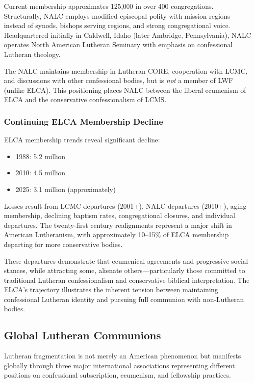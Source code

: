Current membership approximates 125,000 in over 400 congregations. Structurally, NALC employs modified episcopal polity with mission regions instead of synods, bishops serving regions, and strong congregational voice. Headquartered initially in Caldwell, Idaho (later Ambridge, Pennsylvania), NALC operates North American Lutheran Seminary with emphasis on confessional Lutheran theology.

The NALC maintains membership in Lutheran CORE, cooperation with LCMC, and discussions with other confessional bodies, but is \textit{not} a member of LWF (unlike ELCA). This positioning places NALC between the liberal ecumenism of ELCA and the conservative confessionalism of LCMS.

\subsubsection{Continuing ELCA Membership Decline}

ELCA membership trends reveal significant decline:

\begin{itemize}
\item 1988: 5.2 million
\item 2010: 4.5 million
\item 2025: 3.1 million (approximately)
\end{itemize}

Losses result from LCMC departures (2001+), NALC departures (2010+), aging membership, declining baptism rates, congregational closures, and individual departures. The twenty-first century realignments represent a major shift in American Lutheranism, with approximately 10--15\% of ELCA membership departing for more conservative bodies.

These departures demonstrate that ecumenical agreements and progressive social stances, while attracting some, alienate others---particularly those committed to traditional Lutheran confessionalism and conservative biblical interpretation. The ELCA's trajectory illustrates the inherent tension between maintaining confessional Lutheran identity and pursuing full communion with non-Lutheran bodies.

\subsection{Global Lutheran Communions}

Lutheran fragmentation is not merely an American phenomenon but manifests globally through three major international associations representing different positions on confessional subscription, ecumenism, and fellowship practices.

